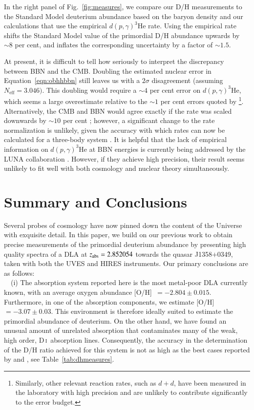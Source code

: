 \documentclass[12pt,preprint,useAMS,usenatbib]{emulateapj}
\newcommand{\DI}{\textrm{D}\,\textsc{i}}
\begin{document}
In the right panel of Fig.~\ref{fig:measures}, we compare our D/H
measurements to the Standard Model deuterium abundance based
on the \citet{Efs15} baryon density and our calculations that use
the empirical $d(p,\gamma)^3\mathrm{He}$ rate.
Using the empirical rate
shifts the Standard Model value of the primordial D/H abundance
upwards by $\sim8$ per cent, and inflates the corresponding
uncertainty by a factor of $\sim1.5$.

At present, it is difficult to tell how seriously to interpret the
discrepancy between BBN and the CMB. Doubling the estimated
nuclear error in Equation~\ref{eqn:obhhbbn} still leaves us with a
$2\sigma$ disagreement (assuming $N_\mathrm{eff} = 3.046)$.
This doubling would require a
$\sim4$ per cent error on $d(p,\gamma)^3\mathrm{He}$, which
seems a large overestimate relative to the $\sim1$ per cent
errors quoted by \citet{Mar16}\footnote{Similarly, other relevant
reaction rates, such as $d+d$,
have been measured in the laboratory with high precision
and are unlikely to contribute significantly to the error
budget.}.
Alternatively, the CMB and BBN would agree exactly if the
\citet{Mar16} rate was scaled downwards by $\sim10$ per cent
\citep[see e.g.][]{DiV14,Efs15}; however, a
significant change to the rate normalization is unlikely, given
the accuracy with which rates can now be calculated for a
three-body system \citep{Kie08}.
It is helpful that the lack of empirical information on
$d(p,\gamma)^3\mathrm{He}$ at BBN energies is currently being
addressed by the LUNA collaboration \citep{Gus14}.
However, if they achieve high precision, their result seems
unlikely to fit well with both cosmology and nuclear theory
simultaneously.


\section{Summary and Conclusions}
\label{sec:conc}

Several probes of cosmology have now pinned down the
content of the Universe with exquisite detail. In this paper,
we build on our previous work to obtain precise
measurements of the primordial deuterium abundance
by presenting high quality spectra of a DLA at $z_{\rm abs}=2.852054$
towards the quasar J1358$+$0349, taken with both the
UVES and HIRES instruments. Our primary
conclusions are as follows:\\

\noindent ~~(i) The absorption system reported here is
the most metal-poor DLA currently known, with an average
oxygen abundance [O/H]~$= -2.804\pm0.015$.
Furthermore, in one of the absorption components, we
estimate [O/H]~$= -3.07\pm0.03$. This environment is
therefore ideally suited to estimate the primordial
abundance of deuterium.
On the other hand, we have found an unusual amount
of unrelated absorption that contaminates many of the weak,
high order, \DI\ absorption lines. Consequently, the accuracy
in the determination of the D/H ratio achieved for this system
is not as high as the best cases reported by
\citet[][J1419$+$0829]{PetCoo12a} and \citet[][J1358$+$6522]{Coo14},
see Table~\ref{tab:dhmeasures}.
\end{document}
